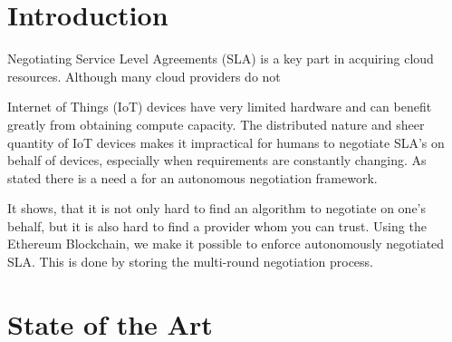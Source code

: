 \chapter{Introduction}



Negotiating Service Level Agreements (SLA) is a key part in acquiring cloud resources. Although many cloud providers do not 


Internet of Things (IoT) devices have very limited hardware and can benefit greatly from obtaining compute capacity. The distributed nature and sheer quantity of IoT devices makes it impractical for humans to negotiate SLA's on behalf of devices, especially when requirements are constantly changing. As stated \cite{autonomous-agent} there is a need a for an autonomous negotiation framework. 

It shows, that it is not only hard to find an algorithm to negotiate on one's behalf, but it is also hard to find a provider whom you can trust.
Using the Ethereum Blockchain, we make it possible to enforce autonomously negotiated SLA. This is done by storing the multi-round negotiation process.


\chapter{State of the Art}





